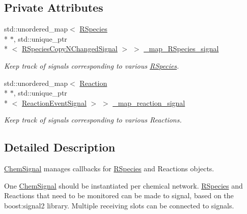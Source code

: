 \subsection*{Private Attributes}
\begin{DoxyCompactItemize}
\item 
std\-::unordered\-\_\-map$<$ \hyperlink{classchem_1_1RSpecies}{R\-Species} \\*
$\ast$, std\-::unique\-\_\-ptr\\*
$<$ \hyperlink{namespacechem_a09aea7e5a24368c13cd7d8d25b4d884e}{R\-Species\-Copy\-N\-Changed\-Signal} $>$ $>$ \hyperlink{classchem_1_1ChemSignal_a7721fb9395d65c7de08108163a3d4cdb}{\-\_\-map\-\_\-\-R\-Species\-\_\-signal}
\begin{DoxyCompactList}\small\item\em Keep track of signals corresponding to various \hyperlink{classchem_1_1RSpecies}{R\-Species}. \end{DoxyCompactList}\item 
std\-::unordered\-\_\-map$<$ \hyperlink{classchem_1_1Reaction}{Reaction} \\*
$\ast$, std\-::unique\-\_\-ptr\\*
$<$ \hyperlink{namespacechem_a85c409cf931d658d253b62ab5ad35781}{Reaction\-Event\-Signal} $>$ $>$ \hyperlink{classchem_1_1ChemSignal_adf624fe946c197ee1a325fb31d6c748d}{\-\_\-map\-\_\-reaction\-\_\-signal}
\begin{DoxyCompactList}\small\item\em Keep track of signals corresponding to various Reactions. \end{DoxyCompactList}\end{DoxyCompactItemize}


\subsection{Detailed Description}
\hyperlink{classchem_1_1ChemSignal}{Chem\-Signal} manages callbacks for \hyperlink{classchem_1_1RSpecies}{R\-Species} and Reactions objects. 

One \hyperlink{classchem_1_1ChemSignal}{Chem\-Signal} should be instantiated per chemical network. \hyperlink{classchem_1_1RSpecies}{R\-Species} and Reactions that need to be monitored can be made to signal, based on the boost\-:signal2 library. Multiple receiving slots can be connected to signals.

